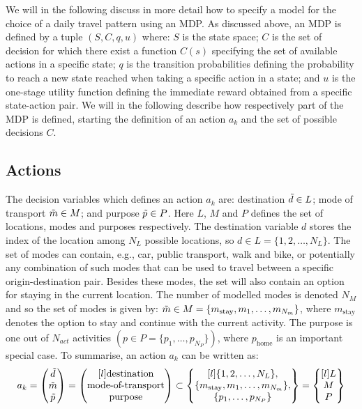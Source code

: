 \newcommand{\s}[1]{s_{#1}}
We will in the following discuss in more detail how to specify a model for the choice of a daily travel pattern using an MDP. As discussed above, an MDP is defined by a tuple $(S,C,q,u)$ where: $S$ is the state space; $C$ is the set of decision for which there exist a function $C(s)$ specifying the set of available actions in a specific state; $q$ is the transition probabilities defining the probability to reach a new state reached when taking a specific action in a state; and $u$ is the one-stage utility function defining the immediate reward obtained from a specific state-action pair. We will in the following describe how respectively part of the MDP is defined, starting the definition of an action $a_k$ and the set of possible decisions $C$.
\subsection{Actions}
The decision variables which defines an action $a_k$ are: destination $\tilde{d} \in L$; mode of transport $\tilde{m} \in M$; and purpose $\tilde{p} \in P$. Here $L$, $M$ and $P$ defines the set of locations, modes and purposes respectively.  The destination variable $d$ stores the index of the location among $N_L$ possible locations, so $d \in  L = \{1,2,\dots, N_L\}$. The set of modes can contain, e.g., car, public transport, walk and bike, or potentially any combination of such modes that can be used to travel between a specific origin-destination pair. Besides these modes, the set will also contain an option for staying in the current location. The number of modelled modes is denoted $N_M$ and so the set of modes is given by: $\tilde{m} \in M = \{m_{\text{stay}},m_1,\dots,m_{N_m}\}$, where $m_{\text{stay}}$ denotes the option to stay and continue with the current activity. The purpose is one out of  $N_{act}$ activities $(p\in P = \{p_1,\dots,p_{N_P}\})$, where $p_\text{home}$ is an important special case.
To summarise, an action $a_k$ can be written as: 
\begin{equation} 
    a_k = \begin{pmatrix}
    \act{d} \\
    \act{m} \\
    \act{p}    
    \end{pmatrix} =
    \begin{pmatrix*}[l]
    \text{destination} \\
    \text{mode-of-transport} \\
    \text{purpose} \\
    \end{pmatrix*} 
    \subset
    \begin{Bmatrix*}[l]
    \{1,2,\dots, N_L\}, \\
    \{m_{\text{stay}},m_1,\dots,m_{N_m}\}, \\
    \{p_1,\dots,p_{N_P}\} 
    \end{Bmatrix*}=
    \begin{Bmatrix*}[l]
    L \\
    M \\
    P \\
    \end{Bmatrix*}
\end{equation}
